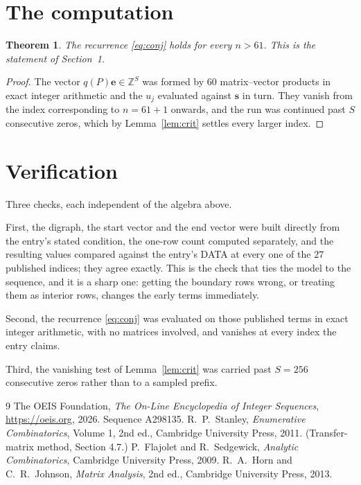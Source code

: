 \documentclass[11pt,a4paper]{article}
\theoremstyle{plain}
\newtheorem{theorem}{Theorem}
\theoremstyle{definition}
\begin{document}
\section{The computation}

\begin{theorem}
The recurrence \eqref{eq:conj} holds for every $n>61$. This is the statement of
Section~1.
\end{theorem}

\begin{proof}
The vector $q(P)\mathbf{e}\in\mathbb{Z}^{S}$ was formed by $60$ matrix--vector
products in exact integer arithmetic and the $u_j$ evaluated against $\mathbf{s}$ in turn.
They vanish from the index corresponding to $n=61+1$ onwards, and the run was continued
past $S$ consecutive zeros, which by Lemma~\ref{lem:crit} settles every larger index.
\end{proof}

\section{Verification}

Three checks, each independent of the algebra above.

First, the digraph, the start vector and the end vector were built directly from the
entry's stated condition, the one-row count computed separately, and the resulting values
compared against the entry's DATA at every one of the $27$ published indices; they
agree exactly. This is the check that ties the model to the sequence, and it is a sharp one:
getting the boundary rows wrong, or treating them as interior rows, changes the early terms
immediately.

Second, the recurrence \eqref{eq:conj} was evaluated on those published terms in exact
integer arithmetic, with no matrices involved, and vanishes at every index the entry claims.

Third, the vanishing test of Lemma~\ref{lem:crit} was carried past $S=256$ consecutive
zeros rather than to a sampled prefix.

\begin{thebibliography}{9}
 The OEIS Foundation, \emph{The On-Line Encyclopedia of Integer
Sequences}, \url{https://oeis.org}, 2026. Sequence A298135.
 R.~P.~Stanley, \emph{Enumerative Combinatorics}, Volume 1, 2nd ed.,
Cambridge University Press, 2011. (Transfer-matrix method, Section 4.7.)
 P.~Flajolet and R.~Sedgewick, \emph{Analytic Combinatorics}, Cambridge
University Press, 2009.
 R.~A.~Horn and C.~R.~Johnson, \emph{Matrix Analysis}, 2nd ed., Cambridge
University Press, 2013.
\end{thebibliography}
\end{document}
